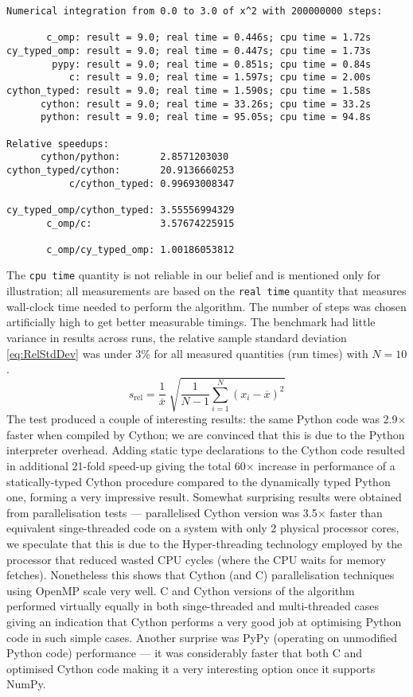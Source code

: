 \begin{Verbatim}[label=typical benchmark run,frame=single]
Numerical integration from 0.0 to 3.0 of x^2 with 200000000 steps:

       c_omp: result = 9.0; real time = 0.446s; cpu time = 1.72s
cy_typed_omp: result = 9.0; real time = 0.447s; cpu time = 1.73s
        pypy: result = 9.0; real time = 0.851s; cpu time = 0.84s
           c: result = 9.0; real time = 1.597s; cpu time = 2.00s
cython_typed: result = 9.0; real time = 1.590s; cpu time = 1.58s
      cython: result = 9.0; real time = 33.26s; cpu time = 33.2s
      python: result = 9.0; real time = 95.05s; cpu time = 94.8s

Relative speedups:
      cython/python:       2.8571203030
cython_typed/cython:       20.9136660253
           c/cython_typed: 0.99693008347

cy_typed_omp/cython_typed: 3.55556994329
       c_omp/c:            3.57674225915

       c_omp/cy_typed_omp: 1.00186053812
\end{Verbatim}
The \verb|cpu time| quantity is not reliable in our belief and is mentioned only for illustration;
all measurements are based on the \verb|real time| quantity that measures wall-clock time needed to
perform the algorithm. The number of steps was chosen artificially high to get better measurable timings.
The benchmark had little variance in results across runs, the relative sample standard deviation
\eqref{eq:RelStdDev} was under 3\% for all measured quantities (run times) with \(N = 10\).
\begin{equation} \label{eq:RelStdDev}
	s_{\text{rel}} = \frac{1}{\overline{x}} \; \sqrt{\frac{1}{N-1} \sum_{i=1}^N (x_i - \overline{x})^2}
\end{equation}
The test produced a couple of interesting results: the same Python code was 2.9\(\times\) faster
when compiled by Cython; we are convinced that this is due to the Python interpreter overhead. Adding
static type declarations to the Cython code resulted in additional 21-fold speed-up giving the total
60\(\times\) increase in performance of a statically-typed Cython procedure compared to the dynamically
typed Python one, forming a very impressive result. Somewhat surprising results were obtained from
parallelisation tests --- parallelised Cython version was 3.5\(\times\) faster than equivalent
singe-threaded code on a system with only 2 physical processor cores, we speculate that this is due
to the Hyper-threading technology employed by the processor that reduced wasted CPU cycles (where
the CPU waits for memory fetches). Nonetheless this shows that Cython (and C) parallelisation techniques
using OpenMP scale very well. C and Cython versions of the algorithm performed virtually equally
in both singe-threaded and multi-threaded cases giving an indication that Cython performs a very good
job at optimising Python code in such simple cases. Another surprise was PyPy (operating on
unmodified Python code) performance --- it was considerably faster that both C and optimised Cython
code making it a very interesting option once it supports NumPy.

